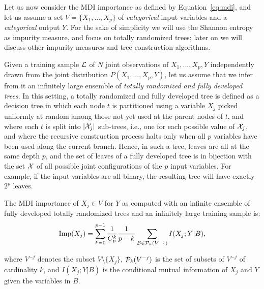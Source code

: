 Let us now consider the MDI  importance as defined by Equation~\ref{eq:mdi},
and let us assume a set $V= \{X_1, ..., X_p\}$  of {\em categorical} input
variables and a {\em categorical} output $Y$. For the sake of simplicity we
will  use the Shannon entropy as impurity measure, and focus on totally
randomized trees; later on we will discuss other impurity measures and tree
construction algorithms.

Given a training sample ${\cal L}$ of $N$ joint observations of $X_1, ..., X_p,
Y$ independently drawn from the joint distribution $P(X_1, ..., X_p, Y)$, let us
assume that we infer from it an infinitely large ensemble of \textit{totally
randomized and fully developed trees}. In this setting, a totally randomized and
fully developed tree is defined as a decision tree in which each node $t$ is
partitioned using a variable $X_j$ picked uniformly at random among those not
yet used at the parent nodes of $t$, and where each $t$ is split into $|{\cal
X}_j|$ sub-trees, i.e., one for each possible value of ${\cal X}_j$, and where
the recursive construction process halts only when all $p$ variables have been
used along the current branch.  Hence, in such a tree, leaves are all at the
same depth $p$, and the set of leaves of a fully developed tree is in bijection
with the set $\cal X$ of all possible joint configurations of the $p$ input
variables. For example, if the input variables are all binary, the resulting
tree will have exactly $2^{p}$ leaves.

\begin{theorem}\label{thm:imp}
The MDI importance of $X_j \in V$ for $Y$ as computed
with an   infinite ensemble of fully developed totally randomized trees and an
infinitely large training sample is:
  \begin{equation}\label{eqn:imp-full}
  \text{Imp}(X_j)=\sum_{k=0}^{p-1} \frac{1}{C_p^k} \frac{1}{p-k} \sum_{B \in {\cal P}_k(V^{-j})} I(X_j;Y|B),
  \end{equation}
\end{theorem}
\noindent where $V^{-j}$ denotes the subset $V \setminus \{X_j\}$, ${\cal
P}_k(V^{-j})$ is the set of subsets of  $V^{-j}$ of cardinality $k$, and
$I(X_j;Y|B)$ is the conditional mutual information of $X_{j}$ and $Y$ given the
variables in $B$.

